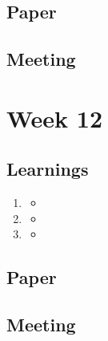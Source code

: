 \section{Paper}

\section{Meeting}
\chapter{Week 12}

\section{Learnings}
\begin{enumerate}
\item
\begin{itemize}
\item
\end{itemize}
\item
\begin{itemize}
\item
\end{itemize}
\item
\begin{itemize}
\item
\end{itemize}
\end{enumerate}

\section{Paper}

\section{Meeting}


